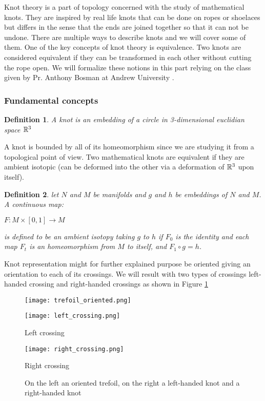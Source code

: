\documentclass[12pt, a4paper]{article}
\newtheorem{definition}{Definition}
\begin{document}
Knot theory is a part of topology concerned with the study of mathematical knots. They are inspired by real life knots  that can be done on ropes or shoelaces but differs in the sense that the ends are joined together so that it can not be undone. There are multiple ways to describe knots and we will cover some of them. One of the key concepts of knot theory is equivalence. Two knots are considered equivalent if they can be transformed in each other without cutting the rope open. We will formalize these notions in this part relying on the class given by Pr. Anthony Bosman at Andrew University \cite{anthony_bosman_knot_2019}.

\subsubsection{Fundamental concepts}

\begin{definition}
  A knot is an embedding of a circle in 3-dimensional euclidian space $\mathbb{R}^3$
\end{definition}

A knot is bounded by all of its homeomorphism since we are studying it from a topological point of view. Two mathematical knots are equivalent if they are ambient isotopic (can be deformed into the other via a deformation of $\mathbb{R}^3$ upon itself).\\

\begin{definition}
  let $N$ and $M$ be manifolds and $g$ and $h$ be embeddings of $N$ and $M$. A continuous map:
   \begin{center}
     $F: M \times [0,1] \to M$
   \end{center}
  is defined to be an ambient isotopy taking $g$ to $h$ if $F_0$ is the identity and each map $F_t$ is an homeomorphism from $M$ to itself, and $F_1 \circ g = h$.
\end{definition}

Knot representation might for further explained purpose be oriented giving an orientation to each of its crossings. We will result with two types of crossings left-handed crossing and right-handed crossings as shown in Figure \ref{fig:oriented_knot}

\begin{figure}[H]
  \begin{minipage}[c]{.5\textwidth}
  \centering
  \texttt{[image: trefoil\_oriented.png]}    
  \end{minipage}
  \begin{minipage}[c]{.20\textwidth}
  \centering
  \texttt{[image: left\_crossing.png]}    
  \caption{Left crossing}
  \end{minipage}
  \begin{minipage}[c]{.20\textwidth}
  \centering
  \texttt{[image: right\_crossing.png]}    
  \caption{Right crossing}
  \end{minipage}
  \caption{On the left an oriented trefoil, on the right a left-handed knot and a right-handed knot}
  \label{fig:oriented_knot} 
\end{figure}
\end{document}
